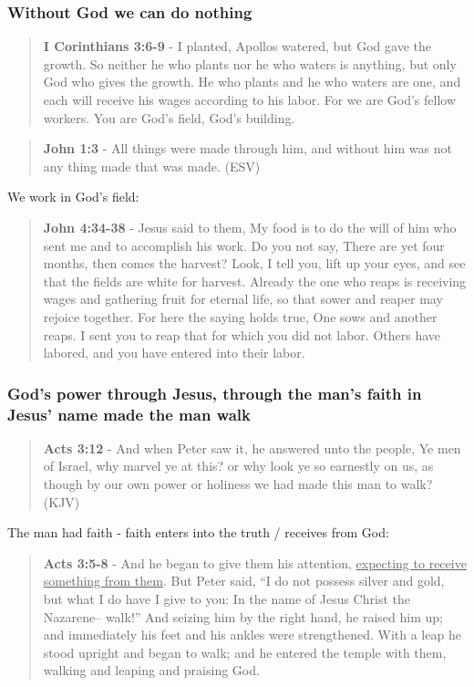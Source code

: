 \documentclass[11pt]{article}
\begin{document}
\subsubsection{Without God we can do nothing}
\label{sec:org05bc8fb}
\begin{quote}
\textbf{I Corinthians 3:6-9} - I planted, Apollos watered, but God gave the growth. So neither he who plants nor he who waters is anything, but only God who gives the growth. He who plants and he who waters are one, and each will receive his wages according to his labor. For we are God's fellow workers. You are God's field, God's building.
\end{quote}

\begin{quote}
\textbf{John 1:3} -  All things were made through him, and without him was not any thing made that was made.  (ESV)
\end{quote}

We work in God's field:

\begin{quote}
\textbf{John 4:34-38} - Jesus said to them, My food is to do the will of him who sent me and to accomplish his work. Do you not say, There are yet four months, then comes the harvest? Look, I tell you, lift up your eyes, and see that the fields are white for harvest. Already the one who reaps is receiving wages and gathering fruit for eternal life, so that sower and reaper may rejoice together. For here the saying holds true, One sows and another reaps. I sent you to reap that for which you did not labor. Others have labored, and you have entered into their labor.
\end{quote}

\subsubsection{God's power through Jesus, through the man's faith in Jesus' name made the man walk}
\label{sec:org846fbe8}
\begin{quote}
\textbf{Acts 3:12} - And when Peter saw it, he answered unto the people, Ye men of Israel, why marvel ye at this? or why look ye so earnestly on us, as though by our own power or holiness we had made this man to walk? (KJV)
\end{quote}

The man had faith - faith enters into the truth / receives from God:

\begin{quote}
\textbf{Acts 3:5-8} - And he began to give them his attention, \uline{expecting to receive something from them}. But Peter said, “I do not possess silver and gold, but what I do have I give to you: In the name of Jesus Christ the Nazarene-- walk!” And seizing him by the right hand, he raised him up; and immediately his feet and his ankles were strengthened. With a leap he stood upright and began to walk; and he entered the temple with them, walking and leaping and praising God.
\end{quote}
\end{document}
